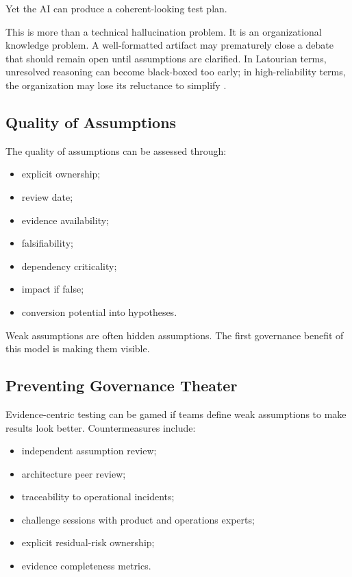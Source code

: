 \documentclass[11pt,a4paper]{article}
\begin{document}
Yet the AI can produce a coherent-looking test plan.

This is more than a technical hallucination problem. It is an organizational knowledge problem. A well-formatted artifact may prematurely close a debate that should remain open until assumptions are clarified. In Latourian terms, unresolved reasoning can become black-boxed too early; in high-reliability terms, the organization may lose its reluctance to simplify \cite{latour,weick}.

\subsection{Quality of Assumptions}

The quality of assumptions can be assessed through:
\begin{itemize}
\item explicit ownership;
\item review date;
\item evidence availability;
\item falsifiability;
\item dependency criticality;
\item impact if false;
\item conversion potential into hypotheses.
\end{itemize}

Weak assumptions are often hidden assumptions. The first governance benefit of this model is making them visible.

\subsection{Preventing Governance Theater}

Evidence-centric testing can be gamed if teams define weak assumptions to make results look better. Countermeasures include:
\begin{itemize}
\item independent assumption review;
\item architecture peer review;
\item traceability to operational incidents;
\item challenge sessions with product and operations experts;
\item explicit residual-risk ownership;
\item evidence completeness metrics.
\end{itemize}
\end{document}
